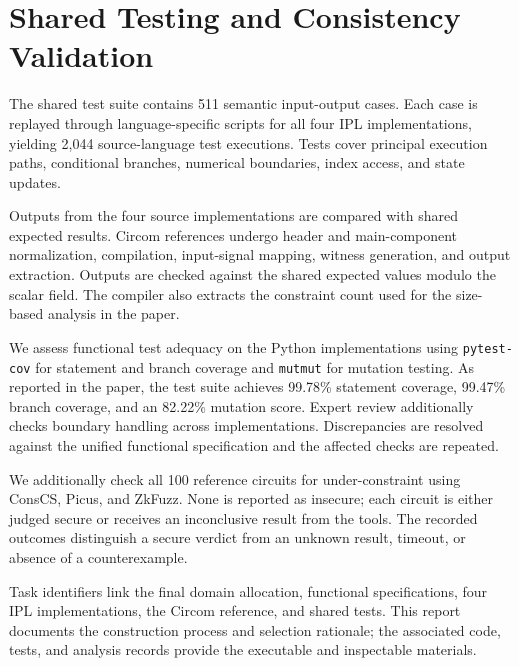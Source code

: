 \documentclass[11pt,a4paper]{article}
\begin{document}
\section{Shared Testing and Consistency Validation}

The shared test suite contains 511 semantic input-output cases. Each case is replayed through language-specific scripts for all four IPL implementations, yielding 2,044 source-language test executions. Tests cover principal execution paths, conditional branches, numerical boundaries, index access, and state updates.

Outputs from the four source implementations are compared with shared expected results. Circom references undergo header and main-component normalization, compilation, input-signal mapping, witness generation, and output extraction. Outputs are checked against the shared expected values modulo the scalar field. The compiler also extracts the constraint count used for the size-based analysis in the paper.

We assess functional test adequacy on the Python implementations using \texttt{pytest-cov} for statement and branch coverage and \texttt{mutmut} for mutation testing. As reported in the paper, the test suite achieves 99.78\% statement coverage, 99.47\% branch coverage, and an 82.22\% mutation score. Expert review additionally checks boundary handling across implementations. Discrepancies are resolved against the unified functional specification and the affected checks are repeated.

We additionally check all 100 reference circuits for under-constraint using ConsCS, Picus, and ZkFuzz. None is reported as insecure; each circuit is either judged secure or receives an inconclusive result from the tools. The recorded outcomes distinguish a secure verdict from an unknown result, timeout, or absence of a counterexample.

Task identifiers link the final domain allocation, functional specifications, four IPL implementations, the Circom reference, and shared tests. This report documents the construction process and selection rationale; the associated code, tests, and analysis records provide the executable and inspectable materials.
\end{document}
